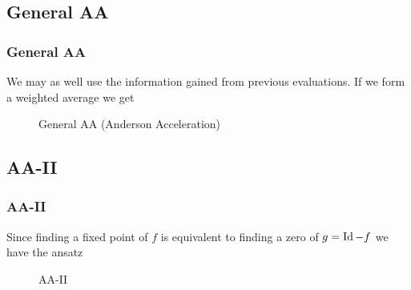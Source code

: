 \subsection{General AA}
\begin{frame}
	\frametitle{General AA}
	We may as well use the information gained from previous evaluations. If we form a weighted average we get
	
	\begin{figure}
	\begin{algorithm}[H]
	\caption{General AA (Anderson Acceleration)}
	\color{gray}
	
	\BlankLine
	\end{algorithm}
	\end{figure}
\end{frame}

\subsection{AA-II}
\begin{frame}
	\frametitle{AA-II}
	Since finding a fixed point of $f$ is equivalent to finding a zero of $g=\operatorname{Id}-f$ we have the ansatz
	
	\begin{figure}
	\begin{algorithm}[H]
	\caption{AA-II}
	\color{gray}
	\BlankLine
	\end{algorithm}
	\end{figure}
\end{frame}

